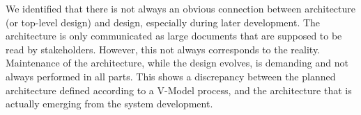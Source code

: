 We identified that there is not always an obvious connection between  
architecture (or top-level design) and  design, especially during later development. 
The architecture is only communicated as large documents
that are supposed to be read by stakeholders. However, this not always corresponds to the reality. Maintenance of the
architecture, while the design evolves, is demanding and not
always performed in all parts. 
This shows a discrepancy between the planned architecture defined according to a V-Model process, and the architecture that is actually emerging from the system development. 

%
%
%
